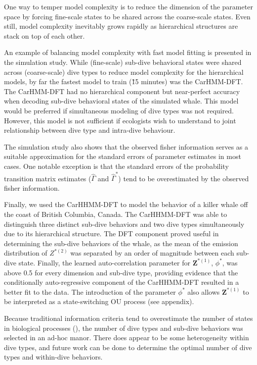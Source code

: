 One way to temper model complexity is to reduce the dimension of the parameter space by forcing fine-scale states to be shared across the coarse-scale states. Even still, model complexity inevitably grows rapidly as hierarchical structures are stack on top of each other.

An example of balancing model complexity with fast model fitting is presented in the simulation study. While (fine-scale) sub-dive behavioral states were shared across (coarse-scale) dive types to reduce model complexity for the hierarchical models, by far the fastest model to train (\~ 15 minutes) was the CarHMM-DFT. The CarHMM-DFT had no hierarchical component but near-perfect accuracy when decoding sub-dive behavioral states of the simulated whale. This model would be preferred if simultaneous modeling of dive types was not required. However, this model is not sufficient if ecologists wish to understand to joint relationship between dive type and intra-dive behaviour. 

The simulation study also shows that the observed fisher information serves as a suitable approximation for the standard errors of parameter estimates in most cases. One notable exception is that the standard errors of the probability transition matrix estimates ($\hat \Gamma$ and $\hat \Gamma^*$) tend to be overestimated by the observed fisher information.

Finally, we used the CarHHMM-DFT to model the behavior of a killer whale off the coast of British Columbia, Canada. The CarHHMM-DFT was able to distinguish three distinct sub-dive behaviors and two dive types simultaneously due to its hierarchical structure. The DFT component proved useful in determining the sub-dive behaviors of the whale, as the mean of the emission distribution of $Z^{*(2)}$ was separated by an order of magnitude between each sub-dive state. Finally, the learned auto-correlation parameter for $\mathbf{Z}^{*(1)}$, $\phi^*$, was above 0.5 for every dimension and sub-dive type, providing evidence that the conditionally auto-regressive component of the CarHHMM-DFT resulted in a better fit to the data. The introduction of the parameter $\phi^*$ also allows $\mathbf{Z}^{*(1)}$ to be interpreted as a state-switching OU process (see appendix).

Because traditional information criteria tend to overestimate the number of states in biological processes (\citep{Pohle:2017}), the number of dive types and sub-dive behaviors was selected in an ad-hoc manor. There does appear to be some heterogeneity within dive types, and future work can be done to determine the optimal number of dive types and within-dive behaviors.